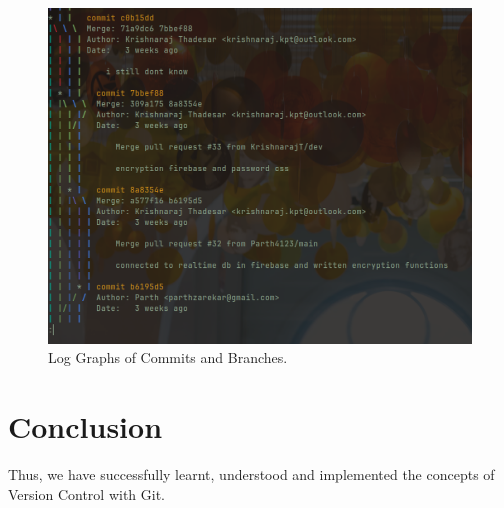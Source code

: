 \documentclass[11pt]{article}
\begin{document}
\begin{figure}[H]
    \centering
    \includegraphics[width=.85\textwidth]{3.png}
    \caption{Log Graphs of Commits and Branches.}
\end{figure}



% 

\section{Conclusion}
Thus, we have successfully learnt, understood and implemented the concepts of Version Control with Git.
\clearpage
\end{document}
